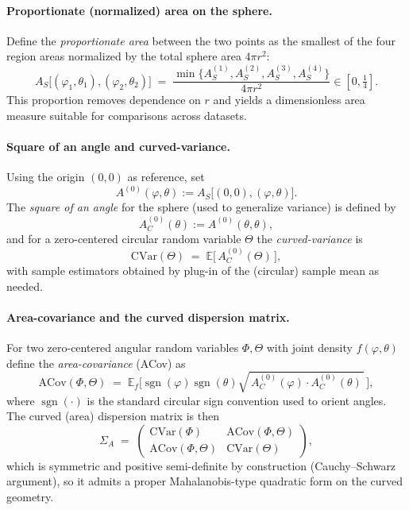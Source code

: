 \documentclass[12pt,a4paper]{report}
\begin{document}
\paragraph{Proportionate (normalized) area on the sphere.}
Define the \emph{proportionate area} between the two points as the smallest of the four region areas normalized by the total sphere area $4\pi r^{2}$:
\begin{equation}
A_S\big[(\varphi_1,\theta_1),(\varphi_2,\theta_2)\big] \;=\; 
\frac{\min\{A_S^{(1)},A_S^{(2)},A_S^{(3)},A_S^{(4)}\}}{4\pi r^{2}} \in [0,\tfrac14].
\label{eq:proportionate_area}
\end{equation}
This proportion removes dependence on $r$ and yields a dimensionless area measure suitable for comparisons across datasets. 

\paragraph{Square of an angle and curved-variance.}
Using the origin $(0,0)$ as reference, set
\begin{equation}
A^{(0)}(\varphi,\theta) := A_S\big[(0,0),(\varphi,\theta)\big].
\end{equation}
The \emph{square of an angle} for the sphere (used to generalize variance) is defined by
\begin{equation}
A^{(0)}_{C}(\theta) := A^{(0)}(\theta,\theta),
\end{equation}
and for a zero-centered circular random variable $\Theta$ the \emph{curved-variance} is
\begin{equation}
\mathrm{CVar}(\Theta) \;=\; \mathbb{E}\big[\,A^{(0)}_{C}(\Theta)\,\big],
\end{equation}
with sample estimators obtained by plug-in of the (circular) sample mean as needed. 

\paragraph{Area-covariance and the curved dispersion matrix.}
For two zero-centered angular random variables $\Phi,\Theta$ with joint density $f(\varphi,\theta)$ define the \emph{area-covariance} (ACov) as
\begin{equation}
\mathrm{ACov}(\Phi,\Theta)\;=\;\mathbb{E}_{f}\Big[\operatorname{sgn}(\varphi)\operatorname{sgn}(\theta)\sqrt{\,A^{(0)}_{C}(\varphi)\cdot A^{(0)}_{C}(\theta)\,}\,\Big],
\end{equation}
where $\operatorname{sgn}(\cdot)$ is the standard circular sign convention used to orient angles. The curved (area) dispersion matrix is then
\begin{equation}
\Sigma_{A} \;=\; 
\begin{pmatrix}
\mathrm{CVar}(\Phi) & \mathrm{ACov}(\Phi,\Theta)\\[4pt]
\mathrm{ACov}(\Phi,\Theta) & \mathrm{CVar}(\Theta)
\end{pmatrix},
\end{equation}
which is symmetric and positive semi-definite by construction (Cauchy–Schwarz argument), so it admits a proper Mahalanobis-type quadratic form on the curved geometry. 
\end{document}
